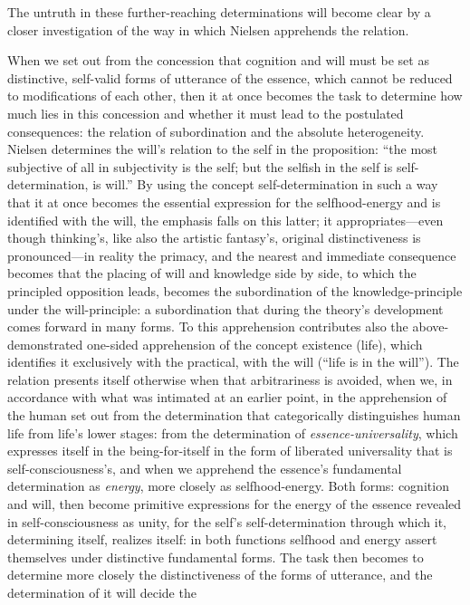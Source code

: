 \documentclass[12pt,a4paper]{book}
\begin{document}
The untruth in these further-reaching determinations will become clear by a closer
investigation of the way in which Nielsen apprehends the relation.

When we set out from the concession that cognition and will must be set as distinctive,
self-valid forms of utterance of the essence, which cannot be reduced to modifications of
each other, then it at once becomes the task to determine how much lies in this concession
and whether it must lead to the postulated consequences: the relation of subordination and
the absolute heterogeneity. Nielsen determines the will's relation to the self in the
proposition: ``the most subjective of all in subjectivity is the self; but the selfish in the
self is self-determination, is will.'' By using the concept self-determination in such a way
that it at once becomes the essential expression for the selfhood-energy and is identified
with the will, the emphasis falls on this latter; it appropriates---even though thinking's,
like also the artistic fantasy's, original distinctiveness is pronounced---in reality the
primacy, and the nearest and immediate consequence becomes that the placing of will and
knowledge side by side, to which the principled opposition leads, becomes the subordination
of the knowledge-principle under the will-principle: a subordination that during the theory's
development comes forward in many forms. To this apprehension contributes also the above-
demonstrated one-sided apprehension of the concept existence (life), which identifies it
exclusively with the practical, with the will (``life is in the will''). The relation
presents itself otherwise when that arbitrariness is avoided, when we, in accordance with
what was intimated at an earlier point, in the apprehension of the human set out from the
determination that categorically distinguishes human life from life's lower stages: from the
determination of \emph{essence-universality}, which expresses itself in the being-for-itself in the
form of liberated universality that is self-consciousness's, and when we apprehend the
essence's fundamental determination as \emph{energy}, more closely as selfhood-energy. Both
forms: cognition and will, then become primitive expressions for the energy of the essence
revealed in self-consciousness as unity, for the self's self-determination through which it,
determining itself, realizes itself: in both functions selfhood and energy assert themselves
under distinctive fundamental forms. The task then becomes to determine more closely the
distinctiveness of the forms of utterance, and the determination of it will decide the
\end{document}
